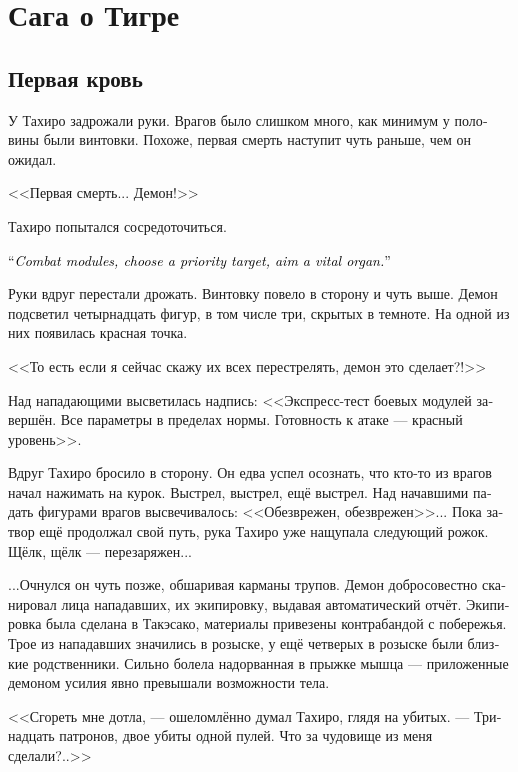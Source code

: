 \documentclass[a4paper,12pt,fleqn]{book}\usepackage{cooltooltips}\usepackage{polyglossia}\setdefaultlanguage[babelshorthands=true]{russian}\setotherlanguage{english}\defaultfontfeatures{Ligatures=TeX,Mapping=tex-text} \usepackage{xcolor}\definecolor{lightgray}{HTML}{bbbbbb}\color{lightgray}\newcommand{\ml}[3]{\textenglish{\textcolor{black}{#3}}}
\newcommand{\asterism}{\vspace{1em}{\centering\Large\bfseries$\ast~\ast~\ast$\par}\vspace{1em}}
\begin{document}
{\chapter{Сага о Тигре}


\section{Первая кровь}

У Тахиро задрожали руки.
Врагов было слишком много, как минимум у половины были винтовки.
Похоже, первая смерть наступит чуть раньше, чем он ожидал.

<<Первая смерть...
Демон!>>

Тахиро попытался сосредоточиться.

\ml{$0$}
{<<Боевые модули, выбрать приоритетную цель, взять на прицел жизненно важные органы>>.}
{``\textit{Combat modules, choose a priority target, aim a vital organ.}''}

Руки вдруг перестали дрожать.
Винтовку повело в сторону и чуть выше.
Демон подсветил четырнадцать фигур, в том числе три, скрытых в темноте.
На одной из них появилась красная точка.

<<То есть если я сейчас скажу их всех перестрелять, демон это сделает?!>>

Над нападающими высветилась надпись:
<<Экспресс-тест боевых модулей завершён.
Все параметры в пределах нормы.
Готовность к атаке --- красный уровень>>.

Вдруг Тахиро бросило в сторону.
Он едва успел осознать, что кто-то из врагов начал нажимать на курок.
Выстрел, выстрел, ещё выстрел.
Над начавшими падать фигурами врагов высвечивалось: <<Обезврежен, обезврежен>>...
Пока затвор ещё продолжал свой путь, рука Тахиро уже нащупала следующий рожок.
Щёлк, щёлк --- перезаряжен...

...Очнулся он чуть позже, обшаривая карманы трупов.
Демон добросовестно сканировал лица нападавших, их экипировку, выдавая автоматический отчёт.
Экипировка была сделана в Такэсако, материалы привезены контрабандой с побережья.
Трое из нападавших значились в розыске, у ещё четверых в розыске были близкие родственники.
Сильно болела надорванная в прыжке мышца --- приложенные демоном усилия явно превышали возможности тела.

<<Сгореть мне дотла, --- ошеломлённо думал Тахиро, глядя на убитых.
--- Тринадцать патронов, двое убиты одной пулей.
Что за чудовище из меня сделали?..>>

\asterism

}
\end{document}

